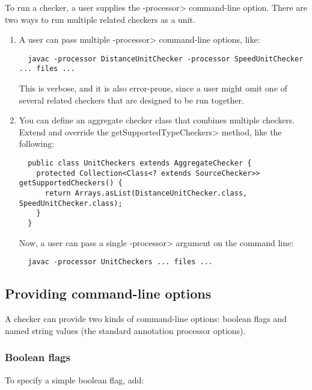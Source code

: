 To run a checker, a user supplies the \<-processor> command-line option.
There are two ways to run multiple related checkers as a unit.

\begin{enumerate}
\item
A user can pass
multiple \<-processor> command-line options, like:

\begin{Verbatim}
  javac -processor DistanceUnitChecker -processor SpeedUnitChecker ... files ...
\end{Verbatim}

\noindent
This is verbose, and it is also error-prone, since a user might omit one of
several related checkers that are designed to be run together.

\item
You can define an aggregate checker class that combines
multiple checkers.  Extend  and override
the \<getSupportedTypeCheckers> method, like the following:

\begin{Verbatim}
  public class UnitCheckers extends AggregateChecker {
    protected Collection<Class<? extends SourceChecker>> getSupportedCheckers() {
      return Arrays.asList(DistanceUnitChecker.class, SpeedUnitChecker.class);
    }
  }
\end{Verbatim}

\noindent
Now, a user can pass a single \<-processor> argument on the command line:

\begin{Verbatim}
  javac -processor UnitCheckers ... files ...
\end{Verbatim}

\end{enumerate}



\subsection{Providing command-line options}

A checker can provide two kinds of command-line options:
boolean flags and
named string values (the standard annotation processor
options).

\subsubsection{Boolean flags}

To specify a simple boolean flag, add:

